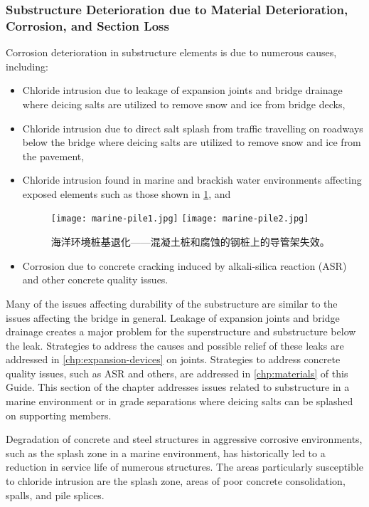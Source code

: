 \subsubsection{Substructure Deterioration due to Material Deterioration, Corrosion, and Section Loss}
Corrosion deterioration in substructure elements is due to numerous causes, including:
\begin{itemize}
  \item Chloride intrusion due to leakage of expansion joints and bridge drainage where deicing salts are utilized to remove snow and ice from bridge decks,
  \item Chloride intrusion due to direct salt splash from traffic travelling on roadways below the bridge where deicing salts are utilized to remove snow and ice from the pavement,
  \item Chloride intrusion found in marine and brackish water environments affecting exposed elements such as  those shown in \cref{fig:marine-pile-degradation}, and
  \begin{figure}
    \texttt{[image: marine-pile1.jpg]}\hfill
    \texttt{[image: marine-pile2.jpg]}
    \caption{海洋环境桩基退化——混凝土桩和腐蚀的钢桩上的导管架失效。}
    \label{fig:marine-pile-degradation}
  \end{figure}
  \item  Corrosion due to concrete cracking induced by alkali-silica reaction (ASR) and other concrete quality issues.
\end{itemize}

Many of the issues affecting durability of the substructure are similar to the issues affecting the bridge in general.
Leakage of expansion joints and bridge drainage creates a major problem for the superstructure and substructure
below the leak. Strategies to address the causes and possible relief of these leaks are addressed in \cref{chp:expansion-devices} on joints.
Strategies to address concrete quality issues, such as ASR and others, are addressed in \cref{chp:materials} of this Guide. This
section of the chapter addresses issues related to substructure in a marine environment or in grade separations where
deicing salts can be splashed on supporting members.

Degradation of concrete and steel structures in aggressive corrosive environments, such as the splash zone in a
marine environment, has historically led to a reduction in service life of numerous structures. The areas particularly
susceptible to chloride intrusion are the splash zone, areas of poor concrete consolidation, spalls, and pile splices.

